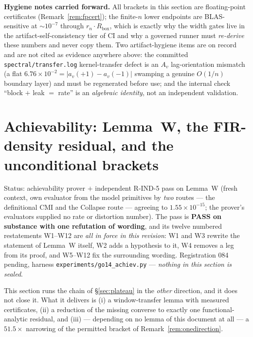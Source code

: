 \documentclass[11pt]{article}
\theoremstyle{definition}
\theoremstyle{remark}
\begin{document}
\medskip\noindent\textbf{Hygiene notes carried forward.} All brackets
in this section are floating-point certificates (Remark~\ref{rem:fpcert});
the finite-$n$ lower endpoints are BLAS-sensitive at $\sim10^{-7}$
through $r_n\!\cdot\!R_{\mathrm{box}}$, which is exactly why the width
gates live in the artifact-self-consistency tier of CI and why a
governed runner must \emph{re-derive} these numbers and never copy
them. Two artifact-hygiene items are on record and are not cited as
evidence anywhere above: the committed
\texttt{spectral/transfer.log} kernel-transfer defect is an $A_v$
lag-orientation mismatch (a flat $6.76\times10^{-2}=|a_v(+1)-a_v(-1)|$
swamping a genuine $O(1/n)$ boundary layer) and must be regenerated
before use; and the internal check ``block $+$ leak $=$ rate'' is an
\emph{algebraic identity}, not an independent validation.

\section{Achievability: Lemma~W, the FIR-density residual, and the
unconditional brackets}
\label{sec:achiev}
Status: achievability prover $+$ independent R-IND-5 pass on Lemma~W (fresh
context, own evaluator from the model primitives by \emph{two} routes --- the
definitional CMI and the Collapse route --- agreeing to
$1.55\times10^{-15}$; the prover's evaluators supplied no rate or distortion
number). The pass is \textbf{PASS on substance with one refutation of
wording}, and its twelve numbered restatements W1--W12 are \emph{all in force
in this revision}: W1 and W3 rewrite the statement of Lemma~W itself, W2 adds
a hypothesis to it, W4 removes a leg from its proof, and W5--W12 fix the
surrounding wording. Registration 084 pending, harness
\texttt{experiments/\allowbreak go14\_achiev.py} --- \emph{nothing in this
section is sealed}.

This section runs the chain of \S\ref{sec:plateau} in the \emph{other}
direction, and it does not close it. What it delivers is (i) a window-transfer
lemma with measured certificates, (ii) a reduction of the missing converse to
exactly one functional-analytic residual, and (iii) --- depending on no lemma
of this document at all --- a $51.5\times$ narrowing of the permitted bracket
of Remark~\ref{rem:onedirection}.
\end{document}
